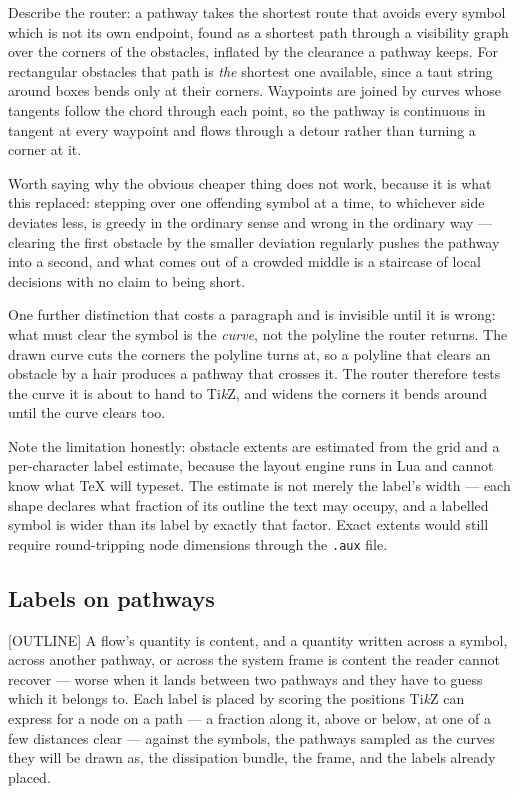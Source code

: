 Describe the router: a pathway takes the shortest route that avoids every
symbol which is not its own endpoint, found as a shortest path through a
visibility graph over the corners of the obstacles, inflated by the clearance a
pathway keeps. For rectangular obstacles that path is \emph{the} shortest one
available, since a taut string around boxes bends only at their corners.
Waypoints are joined by curves whose tangents follow the chord through each
point, so the pathway is continuous in tangent at every waypoint and flows
through a detour rather than turning a corner at it.

Worth saying why the obvious cheaper thing does not work, because it is what
this replaced: stepping over one offending symbol at a time, to whichever side
deviates less, is greedy in the ordinary sense and wrong in the ordinary way ---
clearing the first obstacle by the smaller deviation regularly pushes the
pathway into a second, and what comes out of a crowded middle is a staircase of
local decisions with no claim to being short.

One further distinction that costs a paragraph and is invisible until it is
wrong: what must clear the symbol is the \emph{curve}, not the polyline the
router returns. The drawn curve cuts the corners the polyline turns at, so a
polyline that clears an obstacle by a hair produces a pathway that crosses it.
The router therefore tests the curve it is about to hand to Ti\emph{k}Z, and
widens the corners it bends around until the curve clears too.

Note the limitation honestly: obstacle extents are estimated from the grid and a
per-character label estimate, because the layout engine runs in Lua and cannot
know what \TeX{} will typeset. The estimate is not merely the label's width ---
each shape declares what fraction of its outline the text may occupy, and a
labelled symbol is wider than its label by exactly that factor. Exact extents
would still require round-tripping node dimensions through the \texttt{.aux}
file.

\subsection{Labels on pathways}

[OUTLINE] A flow's quantity is content, and a quantity written across a symbol,
across another pathway, or across the system frame is content the reader cannot
recover --- worse when it lands between two pathways and they have to guess
which it belongs to. Each label is placed by scoring the positions Ti\emph{k}Z
can express for a node on a path --- a fraction along it, above or below, at one
of a few distances clear --- against the symbols, the pathways sampled as the
curves they will be drawn as, the dissipation bundle, the frame, and the labels
already placed.

